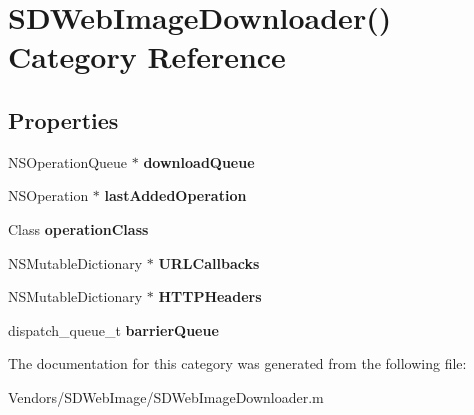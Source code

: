 \hypertarget{category_s_d_web_image_downloader_07_08}{}\section{S\+D\+Web\+Image\+Downloader() Category Reference}
\label{category_s_d_web_image_downloader_07_08}
\subsection*{Properties}
\begin{DoxyCompactItemize}
\item 
\hypertarget{category_s_d_web_image_downloader_07_08_a90b193308b6aa04efb61af2f968a0638}{}N\+S\+Operation\+Queue $\ast$ {\bfseries download\+Queue}\label{category_s_d_web_image_downloader_07_08_a90b193308b6aa04efb61af2f968a0638}

\item 
\hypertarget{category_s_d_web_image_downloader_07_08_a28e4e8d6db9c6182abe42716ec123285}{}N\+S\+Operation $\ast$ {\bfseries last\+Added\+Operation}\label{category_s_d_web_image_downloader_07_08_a28e4e8d6db9c6182abe42716ec123285}

\item 
\hypertarget{category_s_d_web_image_downloader_07_08_a170369ea938fa4d6b908a618249f6659}{}Class {\bfseries operation\+Class}\label{category_s_d_web_image_downloader_07_08_a170369ea938fa4d6b908a618249f6659}

\item 
\hypertarget{category_s_d_web_image_downloader_07_08_a1825d988a26a66fcf85720f6feb0bbf1}{}N\+S\+Mutable\+Dictionary $\ast$ {\bfseries U\+R\+L\+Callbacks}\label{category_s_d_web_image_downloader_07_08_a1825d988a26a66fcf85720f6feb0bbf1}

\item 
\hypertarget{category_s_d_web_image_downloader_07_08_ad0fc833f6b66129357e4fef18bb74b07}{}N\+S\+Mutable\+Dictionary $\ast$ {\bfseries H\+T\+T\+P\+Headers}\label{category_s_d_web_image_downloader_07_08_ad0fc833f6b66129357e4fef18bb74b07}

\item 
\hypertarget{category_s_d_web_image_downloader_07_08_a599eea6513973b0838bbf18a43a27876}{}dispatch\+\_\+queue\+\_\+t {\bfseries barrier\+Queue}\label{category_s_d_web_image_downloader_07_08_a599eea6513973b0838bbf18a43a27876}

\end{DoxyCompactItemize}


The documentation for this category was generated from the following file\+:\begin{DoxyCompactItemize}
\item 
Vendors/\+S\+D\+Web\+Image/S\+D\+Web\+Image\+Downloader.\+m\end{DoxyCompactItemize}
